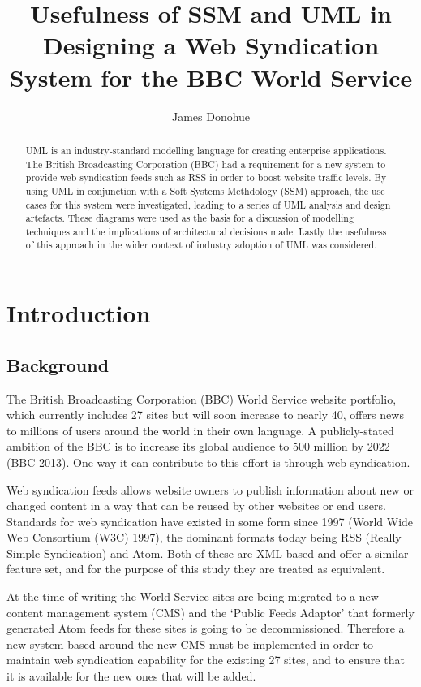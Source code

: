 \documentclass[a4paper]{article}
\begin{document}
\title{Usefulness of SSM and UML in Designing a Web Syndication System for the BBC World Service}
\author{James Donohue}

\maketitle

\begin{abstract}
UML\cite{omg2011} is an industry-standard modelling language for creating enterprise applications. The British Broadcasting Corporation (BBC) had a requirement for a new system to provide web syndication feeds such as RSS in order to boost website traffic levels. By using UML in conjunction with a Soft Systems Methdology (SSM) approach, the use cases for this system were investigated, leading to a series of UML analysis and design artefacts. These diagrams were used as the basis for a discussion of modelling techniques and the implications of architectural decisions made. Lastly the usefulness of this approach in the wider context of industry adoption of UML was considered.
\end{abstract}

\section{Introduction}
\subsection{Background}

The British Broadcasting Corporation (BBC) World Service website portfolio, which currently includes 27 sites but will soon increase to nearly 40, offers news to millions of users around the world in their own language. A publicly-stated ambition of the BBC is to increase its global audience to 500 million by 2022 (BBC 2013). One way it can contribute to this effort is through web syndication.

Web syndication feeds allows website owners to publish information about new or changed content in a way that can be reused by other websites or end users. Standards for web syndication have existed in some form since 1997 (World Wide Web Consortium (W3C) 1997), the dominant formats today being RSS (Really Simple Syndication) and Atom. Both of these are XML-based and offer a similar feature set, and for the purpose of this study they are treated as equivalent.

At the time of writing the World Service sites are being migrated to a new content management system (CMS) and the `Public Feeds Adaptor' that formerly generated Atom feeds for these sites is going to be decommissioned. Therefore a new system based around the new CMS must be implemented in order to maintain web syndication capability for the existing 27 sites, and to ensure that it is available for the new ones that will be added.
\end{document}
